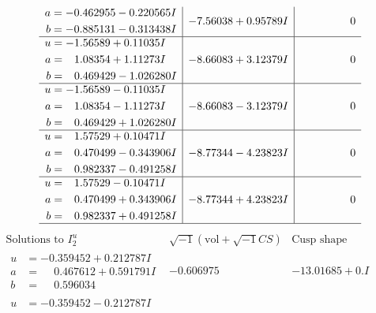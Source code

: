 \documentclass[1p]{elsarticle_modified}
\theoremstyle{definition}
\newcommand{\I}{\sqrt{-1}}
\begin{document}
$$\begin{array}{c|c|c}
\begin{aligned}
a &= -0.462955 - 0.220565 I \\
b &= -0.885131 - 0.313438 I\end{aligned}
 & -7.56038 + 0.95789 I & \phantom{-0.000000 } 0 \\ \hline\begin{aligned}
u &= -1.56589 + 0.11035 I \\
a &= \phantom{-}1.08354 + 1.11273 I \\
b &= \phantom{-}0.469429 - 1.026280 I\end{aligned}
 & -8.66083 + 3.12379 I & \phantom{-0.000000 } 0 \\ \hline\begin{aligned}
u &= -1.56589 - 0.11035 I \\
a &= \phantom{-}1.08354 - 1.11273 I \\
b &= \phantom{-}0.469429 + 1.026280 I\end{aligned}
 & -8.66083 - 3.12379 I & \phantom{-0.000000 } 0 \\ \hline\begin{aligned}
u &= \phantom{-}1.57529 + 0.10471 I \\
a &= \phantom{-}0.470499 - 0.343906 I \\
b &= \phantom{-}0.982337 - 0.491258 I\end{aligned}
 & -8.77344 - 4.23823 I & \phantom{-0.000000 } 0 \\ \hline\begin{aligned}
u &= \phantom{-}1.57529 - 0.10471 I \\
a &= \phantom{-}0.470499 + 0.343906 I \\
b &= \phantom{-}0.982337 + 0.491258 I\end{aligned}
 & -8.77344 + 4.23823 I & \phantom{-0.000000 } 0\\
 \hline 
 \end{array}$$\newpage$$\begin{array}{c|c|c}  
\text{Solutions to }I^u_{2}& \I (\text{vol} + \sqrt{-1}CS) & \text{Cusp shape}\\
 \hline 
\begin{aligned}
u &= -0.359452 + 0.212787 I \\
a &= \phantom{-}0.467612 + 0.591791 I \\
b &= \phantom{-}0.596034\phantom{ +0.000000I}\end{aligned}
 & -0.606975\phantom{ +0.000000I} & -13.01685 + 0. I\phantom{ +0.000000I} \\ \hline\begin{aligned}
u &= -0.359452 - 0.212787 I \\

\end{aligned}
\end{array}$$
\end{document}
